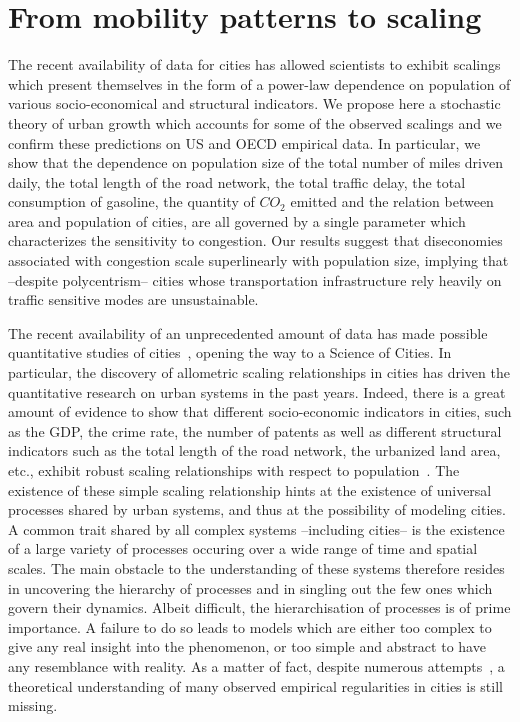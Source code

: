 %
\chapter{From mobility patterns to scaling}
\label{sec:from_mobility_patterns_to_scaling}


The recent availability of data for cities has allowed scientists to exhibit scalings which present themselves in the form of a power-law dependence on population of various socio-economical and structural indicators. We propose here a stochastic theory of urban growth which accounts for some of the observed scalings and we confirm these predictions on US and OECD empirical data. In particular, we show that the dependence on population size of the total number of miles driven daily, the total length of the road network, the total traffic delay, the total consumption of gasoline, the quantity of $CO_2$ emitted and the relation between area and population of cities, are all governed by a single parameter which characterizes the sensitivity to congestion. Our results suggest that diseconomies associated with congestion scale superlinearly with population size, implying that --despite polycentrism-- cities whose transportation infrastructure rely heavily on traffic sensitive modes are unsustainable.



The recent availability of an unprecedented amount of data has made possible quantitative studies of cities~\cite{Fujita:1999,Batty:2007,Marshall:2004}, opening the way to a Science of Cities. In particular, the discovery of allometric scaling relationships in cities has driven the quantitative research on urban systems in the past years. Indeed, there is a great amount of evidence to show that different socio-economic indicators in cities, such as the GDP, the crime rate, the number of patents as well as different structural indicators such as the total length of the road network, the urbanized land area, etc., exhibit robust scaling relationships with respect to population~\cite{Newman:1989,Makse:1995,Pumain:2006,Bettencourt:2007,Samaniego:2008,Rozenfeld:2008,Pan:2013}. The existence of these simple scaling relationship hints at the existence of universal processes shared by urban systems, and thus at the possibility of modeling cities.\\

A common trait shared by all complex systems --including cities-- is the existence of a large variety of processes occuring over a wide range of time and spatial scales. The main obstacle to the understanding of these systems therefore resides in uncovering the hierarchy of processes and in singling out the few ones which govern their dynamics. Albeit difficult, the hierarchisation of processes is of prime importance. A failure to do so leads to models which are  either too complex to give any real insight into the phenomenon, or too simple and abstract to have any resemblance with reality. As a matter of fact, despite numerous attempts~\cite{Fujita:1982,Makse:1995,Batty:2008,Frasco:2013,Bettencourt:2010,Bettencourt:2013}, a theoretical understanding of many observed empirical regularities in cities is still missing.\\

